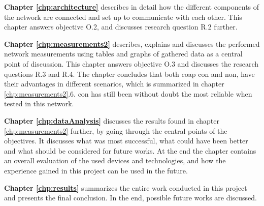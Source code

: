 \noindent \textbf{Chapter \ref{chp:architecture}} describes in detail how the different components of the network are connected and set up to communicate with each other. This chapter answers objective O.2, and discusses research question R.2 further. 

\noindent \textbf{Chapter \ref{chp:measurements2}} describes, explains and discusses the performed network measurements using tables and graphs of gathered data as a central point of discussion. This chapter answers objective O.3 and discusses the research questions R.3 and R.4. The chapter concludes that both \gls{coap} \gls{con} and \gls{non}, have their advantages in different scenarios, which is summarized in chapter \ref{chp:measurements2}.6. \gls{con} has still been without doubt the most reliable when tested in this network. 

\noindent \textbf{Chapter \ref{chp:dataAnalysis}} discusses the results found in chapter \ref{chp:measurements2} further, by going through the central points of the objectives. It discusses what was most successful, what could have been better and what should be considered for future works. At the end the chapter contains an overall evaluation of the used devices and technologies, and how the experience gained in this project can be used in the future. 

\noindent \textbf{Chapter \ref{chp:results}} summarizes the entire work conducted in this project and presents the final conclusion. In the end, possible future works are discussed. 





